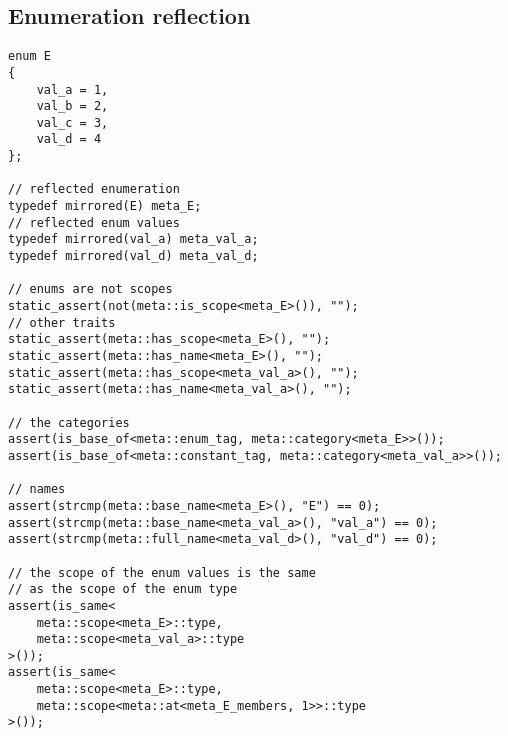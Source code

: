 \subsection{Enumeration reflection}

\begin{verbatim}
enum E
{
	val_a = 1,
	val_b = 2,
	val_c = 3,
	val_d = 4
};

// reflected enumeration
typedef mirrored(E) meta_E;
// reflected enum values
typedef mirrored(val_a) meta_val_a;
typedef mirrored(val_d) meta_val_d;

// enums are not scopes
static_assert(not(meta::is_scope<meta_E>()), "");
// other traits
static_assert(meta::has_scope<meta_E>(), "");
static_assert(meta::has_name<meta_E>(), "");
static_assert(meta::has_scope<meta_val_a>(), "");
static_assert(meta::has_name<meta_val_a>(), "");

// the categories
assert(is_base_of<meta::enum_tag, meta::category<meta_E>>());
assert(is_base_of<meta::constant_tag, meta::category<meta_val_a>>());

// names
assert(strcmp(meta::base_name<meta_E>(), "E") == 0);
assert(strcmp(meta::base_name<meta_val_a>(), "val_a") == 0);
assert(strcmp(meta::full_name<meta_val_d>(), "val_d") == 0);

// the scope of the enum values is the same
// as the scope of the enum type
assert(is_same<
	meta::scope<meta_E>::type,
	meta::scope<meta_val_a>::type
>());
assert(is_same<
	meta::scope<meta_E>::type,
	meta::scope<meta::at<meta_E_members, 1>>::type
>());

\end{verbatim}
